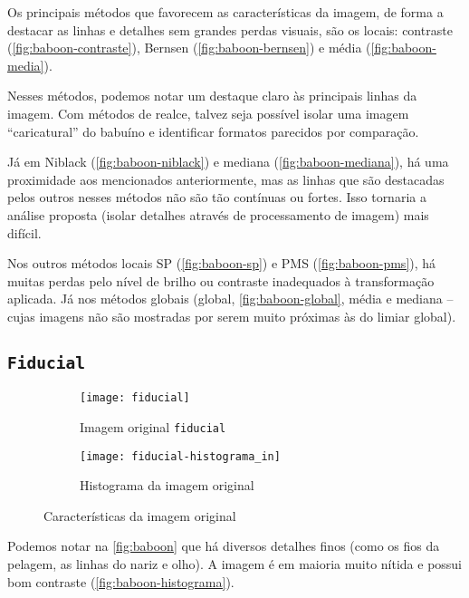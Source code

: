 \documentclass[brazilian,a4paper,twocolumn]{article}
\begin{document}
        Os principais métodos que favorecem as características da imagem, de forma a destacar as linhas e detalhes sem grandes perdas visuais, são os locais: contraste (\cref{fig:baboon-contraste}), Bernsen (\cref{fig:baboon-bernsen}) e média (\cref{fig:baboon-media}).

        Nesses métodos, podemos notar um destaque claro às principais linhas da imagem. Com métodos de realce, talvez seja possível isolar uma imagem ``caricatural'' do babuíno e identificar formatos parecidos por comparação.

        Já em Niblack (\cref{fig:baboon-niblack}) e mediana (\cref{fig:baboon-mediana}), há uma proximidade aos mencionados anteriormente, mas as linhas que são destacadas pelos outros nesses métodos não são tão contínuas ou fortes. Isso tornaria a análise proposta (isolar detalhes através de processamento de imagem) mais difícil.

        Nos outros métodos locais SP (\cref{fig:baboon-sp}) e PMS (\cref{fig:baboon-pms}), há muitas perdas pelo nível de brilho ou contraste inadequados à transformação aplicada. Já nos métodos globais (global, \cref{fig:baboon-global}, média e mediana -- cujas imagens não são mostradas por serem muito próximas às do limiar global).

    \subsection{\texttt{Fiducial}}

        \begin{figure}
            \centering
            \begin{subfigure}{0.30\textwidth}
                \texttt{[image: fiducial]}
                \caption{Imagem original \texttt{fiducial}}
                \label{fig:fiducial}
            \end{subfigure}
            \begin{subfigure}{0.5\textwidth}
                \texttt{[image: fiducial-histograma\_in]}
                \caption{Histograma da imagem original}
                \label{fig:fiducial-histograma}
            \end{subfigure}

            \caption{Características da imagem original}
        \end{figure}

        Podemos notar na \cref{fig:baboon} que há diversos detalhes finos (como os fios da pelagem, as linhas do nariz e olho). A imagem é em maioria muito nítida e possui bom contraste (\cref{fig:baboon-histograma}).
\end{document}

